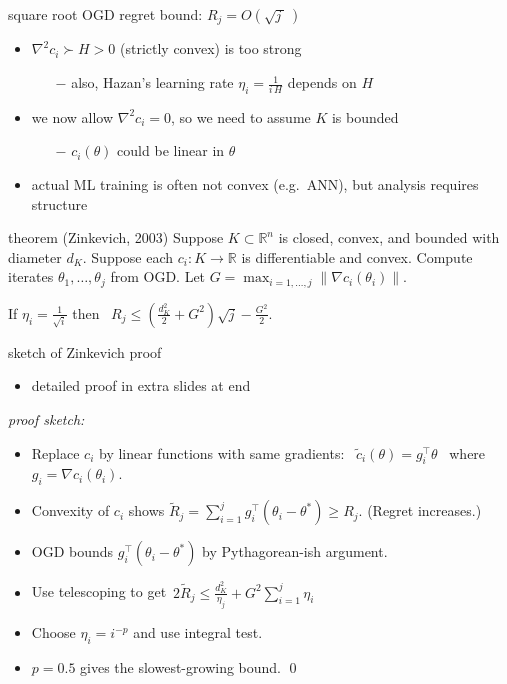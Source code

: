 \documentclass[xcolor={svgnames},
               hyperref={colorlinks,citecolor=DeepPink4,linkcolor=FireBrick,urlcolor=Maroon}]
               {beamer}
\newcommand{\grad}{\nabla}
\newcommand{\RR}{\mathbb{R}}
\newcommand{\ds}{\displaystyle}
\begin{document}
\begin{frame}{square root OGD regret bound: $R_j = O(\sqrt{j\,}\,)$}

\begin{itemize}
\item $\grad^2 c_i \succ H > 0$ (strictly convex) is too strong
    \begin{itemize}
    \item[$-$] also, Hazan's learning rate $\eta_i = \frac{1}{i\,H}$ depends on $H$
    \end{itemize}
\item we now allow $\grad^2 c_i = 0$, so we need to assume $K$ is bounded
    \begin{itemize}
    \item[$-$] $c_i(\theta)$ could be linear in $\theta$
    \end{itemize}
\item actual ML training is often not convex (e.g.~ANN), but analysis requires structure
\end{itemize}

\begin{block}{theorem (Zinkevich, 2003)}
Suppose $K\subset \RR^n$ is closed, convex, and bounded with diameter $d_K$.  Suppose each $c_i:K \to \RR$ is differentiable and convex.  Compute iterates $\theta_1,\dots,\theta_j$ from OGD.  Let $G = \max_{i=1,\dots,j} \|\grad c_i(\theta_i)\|$.

If $\ds \eta_i = \frac{1}{\sqrt{i}}$ then \, $\ds \boxed{R_j \le \left(\frac{d_K^2}{2} + G^2\right) \sqrt{j} - \frac{G^2}{2}.}$
\end{block}
\end{frame}


\begin{frame}{sketch of Zinkevich proof}
\begin{itemize}
\item detailed proof in extra slides at end
\end{itemize}

\bigskip
\noindent \emph{proof sketch:}

\begin{itemize}
\item Replace $c_i$ by linear functions with same gradients: \, $\tilde c_i(\theta) = g_i^\top \theta$ \, where $g_i = \grad c_i(\theta_i)$.
\item Convexity of $c_i$ shows {\small $\ds \tilde R_j = \sum_{i=1}^j g_i^\top (\theta_i - \theta^*) \ge R_j$}.  (Regret increases.)
\item OGD bounds $g_i^\top (\theta_i - \theta^*)$ by Pythagorean-ish argument.
\item Use telescoping to get\, $\ds 2 \tilde R_j \le \frac{d_K^2}{\eta_j} + G^2 \sum_{i=1}^j \eta_i$
\item Choose $\eta_i = i^{-p}$ and use integral test.
\item $p=0.5$ gives the slowest-growing bound. \hfill \qed
\end{itemize}
\end{frame}
\end{document}
